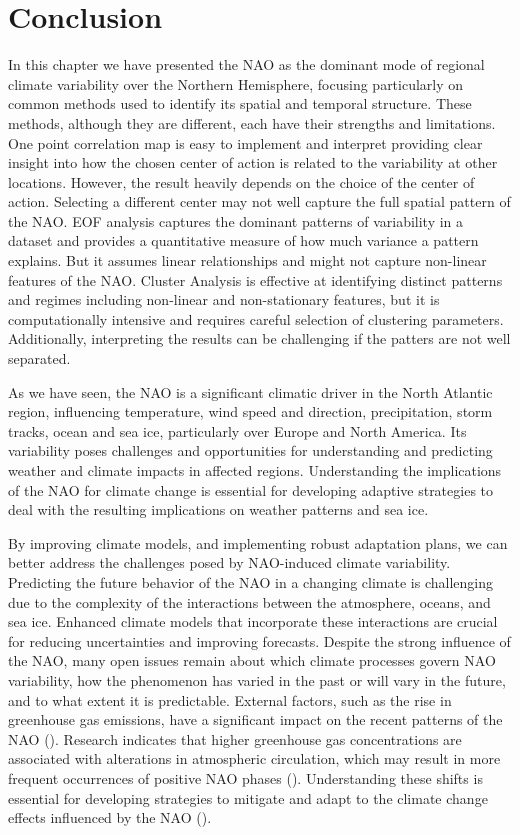 \documentclass[
]{krantz}
\begin{document}
\section{Conclusion}\label{conclusion-1}

In this chapter we have presented the NAO as the dominant mode of regional climate variability over the Northern Hemisphere, focusing particularly on common methods used to identify its spatial and temporal structure. These methods, although they are different, each have their strengths and limitations.
One point correlation map is easy to implement and interpret providing clear insight into how the chosen center of action is related to the variability at other locations. However, the result heavily depends on the choice of the center of action. Selecting a different center may not well capture the full spatial pattern of the NAO. EOF analysis captures the dominant patterns of variability in a dataset and provides a quantitative measure of how much variance a pattern explains. But it assumes linear relationships and might not capture non-linear features of the NAO. Cluster Analysis is effective at identifying distinct patterns and regimes including non-linear and non-stationary features, but it is computationally intensive and requires careful selection of clustering parameters. Additionally, interpreting the results can be challenging if the patters are not well separated.

As we have seen, the NAO is a significant climatic driver in the North Atlantic region, influencing temperature, wind speed and direction, precipitation, storm tracks, ocean and sea ice, particularly over Europe and North America. Its variability poses challenges and opportunities for understanding and predicting weather and climate impacts in affected regions. Understanding the implications of the NAO for climate change is essential for developing adaptive strategies to deal with the resulting implications on weather patterns and sea ice.

By improving climate models, and implementing robust adaptation plans, we can better address the challenges posed by NAO-induced climate variability. Predicting the future behavior of the NAO in a changing climate is challenging due to the complexity of the interactions between the atmosphere, oceans, and sea ice. Enhanced climate models that incorporate these interactions are crucial for reducing uncertainties and improving forecasts. Despite the strong influence of the NAO, many open issues remain about which climate processes govern NAO variability, how the phenomenon has varied in the past or will vary in the future, and to what extent it is predictable. External factors, such as the rise in greenhouse gas emissions, have a significant impact on the recent patterns of the NAO (\citet{gillett2003}). Research indicates that higher greenhouse gas concentrations are associated with alterations in atmospheric circulation, which may result in more frequent occurrences of positive NAO phases (\citet{gillett2003}). Understanding these shifts is essential for developing strategies to mitigate and adapt to the climate change effects influenced by the NAO (\citet{gillett2003}).
\end{document}
